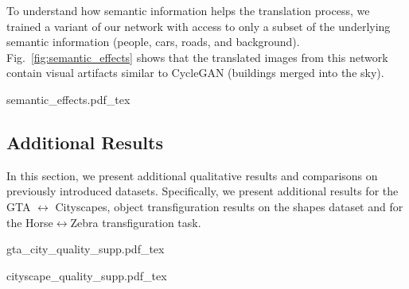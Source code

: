To understand how semantic information helps the translation process, we trained a variant of our network with access to only a subset of the underlying semantic information (people, cars, roads, and background). Fig.~\ref{fig:semantic_effects} shows that the translated images from this network contain visual artifacts similar to CycleGAN (buildings merged into the sky).
\begin{figure*}[!hbpt]
    \centering
    \def\svgwidth{\textwidth}
    {semantic_effects.pdf_tex}
    \caption[Effects of preserving semantics]{Variants of our network, trained with only partial or full class preservation. From top to bottom: Input image and semantic label, our network trained to preserve only classes [car, person, road] and our network trained to preserve all $19$ classes. When only preserving a subset of the classes the network generates visual artifacts, similar to CycleGAN.}
    \label{fig:semantic_effects}
\end{figure*}

\subsection{Additional Results}
In this section, we present additional qualitative results and comparisons on previously introduced datasets. Specifically, we present additional results for the GTA $\leftrightarrow$ Cityscapes, object transfiguration results on the shapes dataset and for the Horse$\leftrightarrow$Zebra transfiguration task.

\begin{figure*}[!hbpt]
    \centering
    \def\svgwidth{\textwidth}
        {gta_city_quality_supp.pdf_tex}
    \caption[Additional results on GTA $\to$ CityScape.]{Domain transfer: Additional results on GTA $\to$ CityScape. We show the performance of CycleGAN and our network. CycleGAN does not preserve the underlying geometry and creates visual artifacts due to switches in class labels.}
    \label{fig:gtaqual_supp}
\end{figure*}


\begin{figure*}[!hbpt]
    \centering
    \def\svgwidth{\textwidth}
        {cityscape_quality_supp.pdf_tex}
    \caption[Additional results on  CityScape $\to$ GTA.]{Additional examples of domain transfer from CityScape $\to$ GTA. Similar to Fig.~\ref{fig:gtaqual_supp}, we compare the performance of CycleGAN and our network. Again, CycleGAN does not preserve the underlying geometry and creates visual artifacts due to switches in class labels.}
    \label{fig:cityqual_supp}
\end{figure*}


